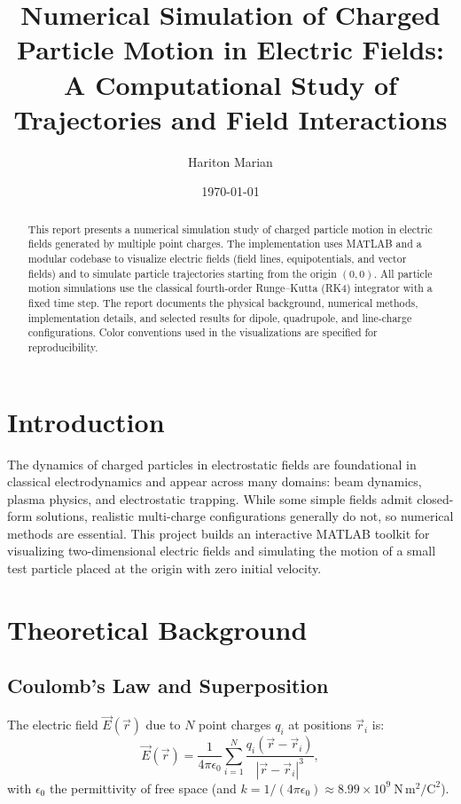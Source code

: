 \documentclass[12pt,a4paper]{article}
\title{
    Numerical Simulation of Charged Particle Motion in Electric Fields:\\
    A Computational Study of Trajectories and Field Interactions
}
\author{Hariton Marian}
\date{\today}
\begin{document}
\maketitle

\begin{abstract}
This report presents a numerical simulation study of charged particle motion in electric fields generated by multiple point charges. The implementation uses MATLAB and a modular codebase to visualize electric fields (field lines, equipotentials, and vector fields) and to simulate particle trajectories starting from the origin $(0,0)$. All particle motion simulations use the classical fourth-order Runge–Kutta (RK4) integrator with a fixed time step. The report documents the physical background, numerical methods, implementation details, and selected results for dipole, quadrupole, and line-charge configurations. Color conventions used in the visualizations are specified for reproducibility.
\end{abstract}

\tableofcontents
\newpage

\section{Introduction}
The dynamics of charged particles in electrostatic fields are foundational in classical electrodynamics and appear across many domains: beam dynamics, plasma physics, and electrostatic trapping. While some simple fields admit closed-form solutions, realistic multi-charge configurations generally do not, so numerical methods are essential. This project builds an interactive MATLAB toolkit for visualizing two-dimensional electric fields and simulating the motion of a small test particle placed at the origin with zero initial velocity.

\section{Theoretical Background}

\subsection{Coulomb's Law and Superposition}
The electric field $\vec{E}(\vec{r})$ due to $N$ point charges $q_i$ at positions $\vec{r}_i$ is:
\begin{equation}
    \vec{E}(\vec{r}) = \frac{1}{4\pi\epsilon_0}\sum_{i=1}^N \frac{q_i (\vec{r}-\vec{r}_i)}{|\vec{r}-\vec{r}_i|^3},
\end{equation}
with $\epsilon_0$ the permittivity of free space (and $k = 1/(4\pi\epsilon_0) \approx 8.99\times10^9\ \mathrm{N\,m^2/C^2}$).
\end{document}
